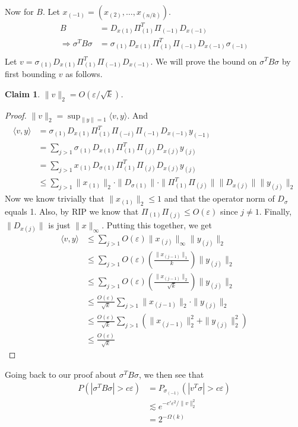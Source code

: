 \documentclass[11pt]{article}
\newtheorem{claim}{Claim}
\newcommand{\ep}{\varepsilon}
\begin{document}
Now for $B$. Let $x_{(-1)} = (x_{(2)}, \ldots, x_{(n/k)})$.
\begin{align*}
B &= D_{x(1)} \Pi_{(1)}^T \Pi_{(-1)} D_{x(-1)} \\
\Rightarrow \sigma^T B \sigma &= \sigma_{(1)} D_{x(1)} \Pi_{(1)}^T \Pi_{(-1)} D_{x(-1)} \sigma_{(-1)} \\
\end{align*}
Let $v = \sigma_{(1)} D_{x(1)} \Pi_{(1)}^T \Pi_{(-1)} D_{x(-1)}$. We will prove the bound on $\sigma^T B \sigma$ by first bounding $v$ as follows.
\begin{claim}
$\|v\|_2 = O(\ep/\sqrt{k})$.
\end{claim}
\begin{proof}
$\|v\|_2 = \sup_{\|y\| = 1} \langle v, y\rangle$. And
\begin{align*}
\langle v, y \rangle &= \sigma_{(1)} D_{x(1)} \Pi_{(1)}^T \Pi_{(-i)} \Pi_{(-1)} D_{x(-1)} y_{(-1)} \\
	&= \sum_{j > 1} \sigma_{(1)} D_{x(1)} \Pi_{(1)}^T \Pi_{(j)} D_{x(j)} y_{(j)} \\
	&= \sum_{j > 1} x_{(1)} D_{\sigma(1)} \Pi_{(1)}^T \Pi_{(j)} D_{x(j)} y_{(j)} \\
	&\leq \sum_{j > 1} \|x_{(1)}\|_2 \cdot \|D_{\sigma(1)}\| \cdot \| \Pi_{(1)}^T \Pi_{(j)}\| \|D_{x(j)}\| \|y_{(j)}\|_2
\end{align*}
Now we know trivially that $\|x_{(1)}\|_2 \leq 1$ and that the operator norm of $D_\sigma$ equals 1. Also, by RIP we know that $\Pi_{(1)}\Pi_{(j)} \leq O(\ep)$ since $j \neq 1$. Finally, $\|D_{x(j)}\|$ is just $\|x\|_\infty$. Putting this together, we get
\begin{align*}
\langle v, y \rangle &\leq \sum_{j>1} O(\ep) \|x_{(j)}\|_\infty \|y_{(j)}\|_2 \\
	&\leq \sum_{j>1} O(\ep) \left( \frac{\|x_{(j-1)}\|_1}{k} \right) \|y_{(j)}\|_2 \tag{shelling} \\
	&\leq \sum_{j>1} O(\ep) \left( \frac{\|x_{(j-1)}\|_2}{\sqrt{k}} \right) \|y_{(j)}\|_2 \tag{Cauchy-Schwarz} \\	
	&\leq \frac{O(\ep)}{\sqrt{k}} \sum_{j > 1} \|x_{(j-1)}\|_2 \cdot \| y_{(j)}\|_2 \\
	&\leq \frac{O(\ep)}{\sqrt{k}} \sum_{j>1} \left( \|x_{(j-1)}\|_2^2 + \| y_{(j)}\|_2^2 \right) \tag{AM-GM} \\
	&\leq \frac{O(\ep)}{\sqrt{k}}
\end{align*}
\end{proof}

Going back to our proof about $\sigma^T B \sigma$, we then see that
\begin{align*}
P(|\sigma^T B \sigma| > c\ep) &= P_{\sigma_{(-1)}}(|v^T \sigma| > c\ep) \\
	&\lesssim e^{-c'\ep^2/\|v\|_2^2} \tag{Khintchine} \\
	&= 2^{-\Omega(k)}
\end{align*}
\end{document}
